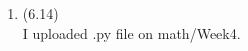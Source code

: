 \documentclass[letterpaper,12pt]{article}
\theoremstyle{definition}
\begin{document}
\begin{enumerate}
	\item (6.14) \\
I uploaded .py file on math/Week4.















\end{enumerate}

\vspace{25mm}


\end{document}
